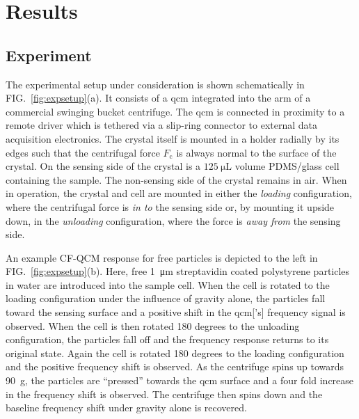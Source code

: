 \documentclass[floatfix,superscriptaddress,a4paper,twocolumn]{revtex4-1}
\newcommand{\Figure}[1]{FIG.~\ref{#1}}
\begin{document}
\section*{Results}
\label{sec:experiment}
\subsection*{Experiment}
The experimental setup under consideration is shown schematically in
\Figure{fig:expsetup}(a).  It consists of a \gls{qcm} integrated into the arm of
a commercial swinging bucket centrifuge.  The \gls{qcm} is connected in proximity
to a remote driver which is tethered via a slip-ring connector to external
data acquisition electronics.  The crystal itself is mounted in a holder
radially by its edges such that the centrifugal force $F_\mathrm{c}$ is
always normal to the surface of the crystal.  On the sensing side of the
crystal is a $\SI{125}{\micro\liter}$ volume PDMS/glass cell containing the
sample.  The non-sensing side of the crystal remains in air.
When in
operation, the crystal and cell are mounted in either the \textit{loading}
configuration, where the centrifugal force is \textit{in to} the sensing
side or, by mounting it upside down, in the \textit{unloading}
configuration, where the force is \textit{away from} the sensing side.

An example CF-QCM response for free particles is depicted to the left in
\Figure{fig:expsetup}(b).  Here, free \SI{1}{\micro\meter} streptavidin
coated polystyrene particles in water are introduced into the sample cell.
When the cell is rotated to the loading configuration under the influence
of gravity alone, the particles fall toward the sensing surface and a positive
shift in the \gls{qcm}['s] frequency signal is observed.  When the cell is then
rotated 180 degrees to the unloading configuration, the particles fall off
and the frequency response returns to its original state.  Again the cell
is rotated 180 degrees to the loading configuration and the positive
frequency shift is observed.  As the centrifuge spins up towards
\SI{90}{g}, the particles are ``pressed'' towards the \gls{qcm} surface and a
four fold increase in the frequency shift is observed.  The centrifuge then
spins down and the baseline frequency shift under gravity alone is
recovered.
\end{document}
